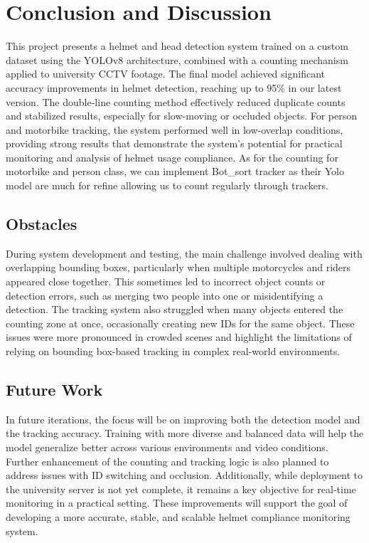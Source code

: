 \chapter{Conclusion and Discussion}
\setlength{\parindent}{2.5em}
This project presents a helmet and head detection system trained on a custom dataset using the YOLOv8 architecture, combined with a counting mechanism applied to university CCTV footage. The final model achieved significant accuracy improvements in helmet detection, reaching up to 95\% in our latest version. The double-line counting method effectively reduced duplicate counts and stabilized results, especially for slow-moving or occluded objects. For person and motorbike tracking, the system performed well in low-overlap conditions, providing strong results that demonstrate the system’s potential for practical monitoring and analysis of helmet usage compliance. As for the counting for motorbike and person class, we can implement Bot\_sort tracker as their Yolo model are much for refine allowing us to count regularly through trackers.

\section{Obstacles}
\setlength{\parindent}{2.5em}
During system development and testing, the main challenge involved dealing with overlapping bounding boxes, particularly when multiple motorcycles and riders appeared close together. This sometimes led to incorrect object counts or detection errors, such as merging two people into one or misidentifying a detection. The tracking system also struggled when many objects entered the counting zone at once, occasionally creating new IDs for the same object. These issues were more pronounced in crowded scenes and highlight the limitations of relying on bounding box-based tracking in complex real-world environments.
\section{Future Work}
\setlength{\parindent}{2.5em}
In future iterations, the focus will be on improving both the detection model and the tracking accuracy. Training with more diverse and balanced data will help the model generalize better across various environments and video conditions. Further enhancement of the counting and tracking logic is also planned to address issues with ID switching and occlusion. Additionally, while deployment to the university server is not yet complete, it remains a key objective for real-time monitoring in a practical setting. These improvements will support the goal of developing a more accurate, stable, and scalable helmet compliance monitoring system.



